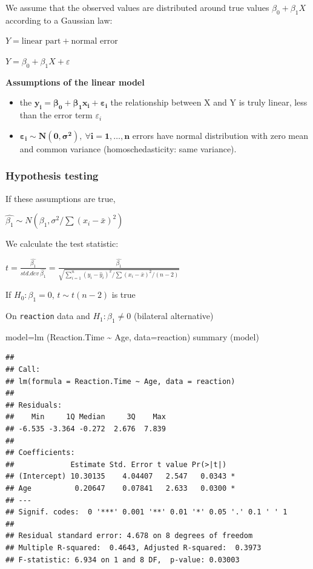 \documentclass[
]{article}
\newenvironment{Shaded}{\begin{snugshade}}{\end{snugshade}}
\newcommand{\AttributeTok}[1]{\textcolor[rgb]{0.77,0.63,0.00}{#1}}
\newcommand{\FunctionTok}[1]{\textcolor[rgb]{0.00,0.00,0.00}{#1}}
\newcommand{\NormalTok}[1]{#1}
\newcommand{\OtherTok}[1]{\textcolor[rgb]{0.56,0.35,0.01}{#1}}
\newcommand{\SpecialCharTok}[1]{\textcolor[rgb]{0.00,0.00,0.00}{#1}}
\providecommand{\tightlist}{%
  \setlength{\itemsep}{0pt}\setlength{\parskip}{0pt}}
\begin{document}
We assume that the observed values are distributed around true values
\(\beta_0 + \beta_1 X\) according to a Gaussian law:

\(Y=\textrm{linear part} + \textrm{normal error}\)

\(Y=\beta_0 + \beta_1 X + \varepsilon\)

\textbf{Assumptions of the linear model }

\begin{itemize}
\tightlist
\item
  the \(\boldsymbol{y_i=\beta_0 + \beta_1 x_i + \varepsilon_i}\) the
  relationship between X and Y is truly linear, less than the error term
  \(\varepsilon_i\)
\item
  \(\boldsymbol{\varepsilon_i \sim N (0, \sigma ^ 2), \ \forall i=1, \ldots, n}\)
  errors have normal distribution with zero mean and common variance
  (homoschedasticity: same variance).
\end{itemize}

\hypertarget{hypothesis-testing}{%
\subsubsection{Hypothesis testing}\label{hypothesis-testing}}

If these assumptions are true,

\(\hat{\beta_1} \sim N (\beta_1, \sigma ^ 2 / \sum (x_i- \bar{x}) ^ 2)\)

We calculate the test statistic:

\(t=\frac{\hat{\beta_1}}{std.dev\ \hat{\beta_1}}=\frac{\hat{\beta_1}}{\sqrt{\sum_{i=1} ^ n (y_i- \hat{y}_i) ^ 2 / \sum (x_i- \bar{x}) ^ 2 / (n-2)}}\)

If \(H_0: \beta_1=0\), \(t \sim t (n-2)\) is true

On \texttt{reaction} data and \(H_1: \beta_1 \neq 0\) (bilateral
alternative)

\begin{Shaded}
\begin{Highlighting}[]
\NormalTok{model}\OtherTok{=}\FunctionTok{lm}\NormalTok{ (Reaction.Time }\SpecialCharTok{\textasciitilde{}}\NormalTok{ Age, }\AttributeTok{data=}\NormalTok{reaction)}
\FunctionTok{summary}\NormalTok{ (model)}
\end{Highlighting}
\end{Shaded}

\begin{verbatim}
## 
## Call:
## lm(formula = Reaction.Time ~ Age, data = reaction)
## 
## Residuals:
##    Min     1Q Median     3Q    Max 
## -6.535 -3.364 -0.272  2.676  7.839 
## 
## Coefficients:
##             Estimate Std. Error t value Pr(>|t|)  
## (Intercept) 10.30135    4.04407   2.547   0.0343 *
## Age          0.20647    0.07841   2.633   0.0300 *
## ---
## Signif. codes:  0 '***' 0.001 '**' 0.01 '*' 0.05 '.' 0.1 ' ' 1
## 
## Residual standard error: 4.678 on 8 degrees of freedom
## Multiple R-squared:  0.4643, Adjusted R-squared:  0.3973 
## F-statistic: 6.934 on 1 and 8 DF,  p-value: 0.03003
\end{verbatim}
\end{document}
